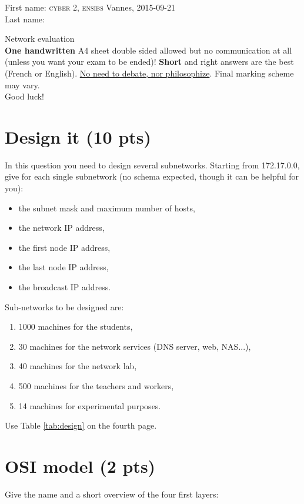 \documentclass[11pt]{article}
\begin{document}
\noindent First name: \hfill {\scshape cyber} 2, {\scshape ensibs} Vannes, 2015-09-21 \\
Last name:
\begin{center}
	{\LARGE{Network evaluation}} \\ \vspace{10pt}
	\textbf{One handwritten} A4 sheet double sided allowed but no communication at all (unless you want your exam to be ended)!
	\textbf{Short} and right answers are the best (French or English). \underline{No need to debate, nor philosophize}. Final marking scheme may vary. \\
	Good luck!
\end{center}

\section{Design it (10 pts)}
	In this question you need to design several subnetworks. Starting from 172.17.0.0, give for each single subnetwork (no schema expected, though it can be helpful for you):
	\begin{itemize}
		\item the subnet mask and maximum number of hosts,
		\item the network IP address,
		\item the first node IP address,
		\item the last node IP address,
		\item the broadcast IP address.
	\end{itemize}
	Sub-networks to be designed are:
	\begin{enumerate}
		\item 1000 machines for the students,
		\item 30 machines for the network services (DNS server, web, NAS...),
		\item 40 machines for the network lab,
		\item 500 machines for the teachers and workers,
		\item 14 machines for experimental purposes.
	\end{enumerate}
Use Table \ref{tab:design} on the fourth page.

\section{OSI model (2 pts)}
	Give the name and a short overview of the four first layers:
\pagebreak
\end{document}
